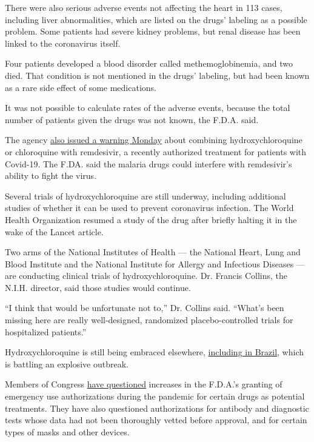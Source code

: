 There were also serious adverse events not affecting the heart in 113
cases, including liver abnormalities, which are listed on the drugs'
labeling as a possible problem. Some patients had severe kidney
problems, but renal disease has been linked to the coronavirus itself.

Four patients developed a blood disorder called methemoglobinemia, and
two died. That condition is not mentioned in the drugs' labeling, but
had been known as a rare side effect of some medications.

It was not possible to calculate rates of the adverse events, because
the total number of patients given the drugs was not known, the F.D.A.
said.

The agency
\href{https://www.fda.gov/media/137566/download?utm_campaign=FDA\%20Warns\%20of\%20Newly\%20Discovered\%20Potential\%20Drug\%20Interaction\%20That\%20May\%20Reduce\%20Effectiveness\&utm_medium=email\&utm_source=Eloqua}{also
issued a warning Monday} about combining hydroxychloroquine or
chloroquine with remdesivir, a recently authorized treatment for
patients with Covid-19. The F.DA. said the malaria drugs could interfere
with remdesivir's ability to fight the virus.

Several trials of hydroxychloroquine are still underway, including
additional studies of whether it can be used to prevent coronavirus
infection. The World Health Organization resumed a study of the drug
after briefly halting it in the wake of the Lancet article.

Two arms of the National Institutes of Health --- the National Heart,
Lung and Blood Institute and the National Institute for Allergy and
Infectious Diseases --- are conducting clinical trials of
hydroxychloroquine. Dr. Francis Collins, the N.I.H. director, said those
studies would continue.

``I think that would be unfortunate not to,'' Dr. Collins said. ``What's
been missing here are really well-designed, randomized
placebo-controlled trials for hospitalized patients.''

Hydroxychloroquine is still being embraced elsewhere,
\href{https://www.nytimes3xbfgragh.onion/2020/06/13/world/americas/virus-brazil-bolsonaro-chloroquine.html}{including
in Brazil,} which is battling an explosive outbreak.

Members of Congress
\href{https://www.warren.senate.gov/imo/media/doc/2020.05.06\%20Letter\%20to\%20FDA\%20re\%20data\%20tracking.pdf}{have
questioned} increases in the F.D.A.'s granting of emergency use
authorizations during the pandemic for certain drugs as potential
treatments. They have also questioned authorizations for antibody and
diagnostic tests whose data had not been thoroughly vetted before
approval, and for certain types of masks and other devices.

